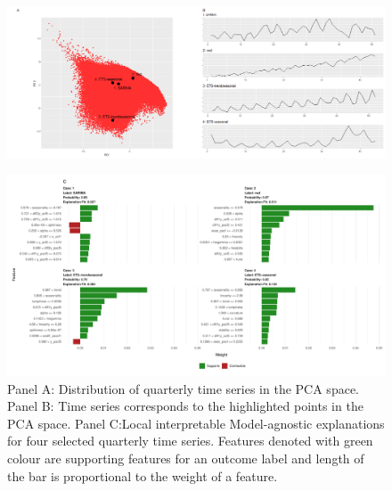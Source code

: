 \documentclass[11pt,a4paper,]{article}
\begin{document}
\begin{figure}[h]

{\centering \includegraphics{figures/quarterlylime-1} 

}

\end{figure}

\begin{figure}[h]

{\centering \includegraphics{figures/quarterlylime2-1} 

}

\caption{Panel A: Distribution of quarterly time series in the PCA space. Panel B: Time series corresponds to the highlighted points in the PCA space. Panel C:Local interpretable Model-agnostic explanations for four selected quarterly time series. Features denoted with green colour are supporting features for an outcome label and length of the bar is proportional to the weight of a feature.}\label{fig:quarterlylime2}
\end{figure}
\end{document}
